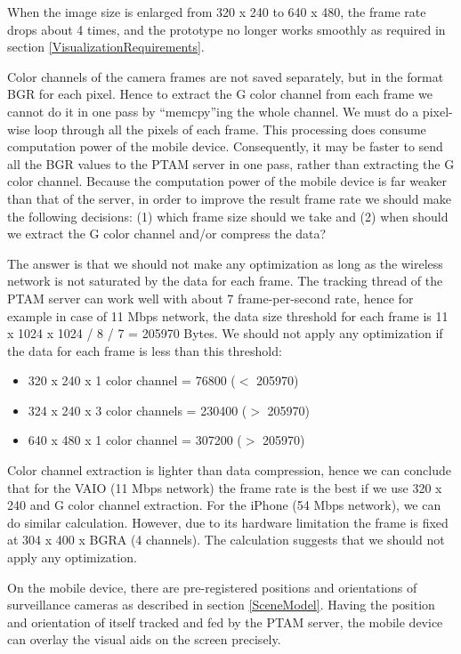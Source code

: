 When the image size is enlarged from 320 x 240 to 640 x 480, the frame rate drops about 4 times, and the prototype no longer works smoothly as required in section \ref{VisualizationRequirements}.

Color channels of the camera frames are not saved separately, but in the format BGR for each pixel. Hence to extract the G color channel from each frame we cannot do it in one pass by ``memcpy''ing the whole channel. We must do a pixel-wise loop through all the pixels of each frame. This processing does consume computation power of the mobile device. Consequently, it may be faster to send all the BGR values to the PTAM server in one pass, rather than extracting the G color channel. Because the computation power of the mobile device is far weaker than that of the server, in order to improve the result frame rate we should make the following decisions: (1) which frame size should we take and (2) when should we extract the G color channel and/or compress the data?

The answer is that we should not make any optimization as long as the wireless network is not saturated by the data for each frame. The tracking thread of the PTAM server can work well with about 7 frame-per-second rate, hence for example in case of 11 Mbps network, the data size threshold for each frame is 11 x 1024 x 1024 / 8 / 7 = 205970 Bytes. We should not apply any optimization if the data for each frame is less than this threshold:

\begin{itemize}
	\item 320 x 240 x 1 color channel = 76800 ($<$ 205970)
	\item 324 x 240 x 3 color channels = 230400 ($>$ 205970)
	\item 640 x 480 x 1 color channel = 307200 ($>$ 205970)
\end{itemize}

Color channel extraction is lighter than data compression, hence we can conclude that for the VAIO (11 Mbps network) the frame rate is the best if we use 320 x 240 and G color channel extraction. For the iPhone (54 Mbps network), we can do similar calculation. However, due to its hardware limitation the frame is fixed at 304 x 400 x BGRA (4 channels). The calculation suggests that we should not apply any optimization.

On the mobile device, there are pre-registered positions and orientations of surveillance cameras as described in section \ref{SceneModel}. Having the position and orientation of itself tracked and fed by the PTAM server, the mobile device can overlay the visual aids on the screen precisely.

